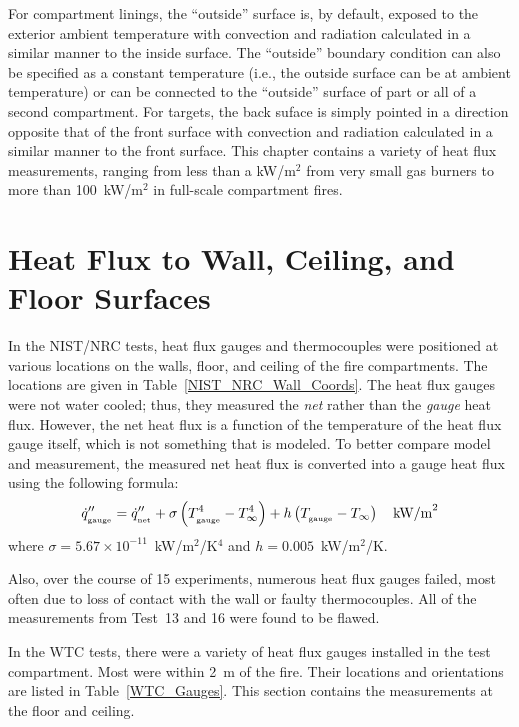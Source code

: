 For compartment linings, the ``outside'' surface is, by default, exposed to the exterior ambient temperature with convection and radiation calculated in a similar manner to the inside surface.  The ``outside'' boundary condition can also be specified as a constant temperature (i.e., the outside surface can be at ambient temperature) or can be connected to the ``outside'' surface of part or all of a second compartment.  For targets, the back suface is simply pointed in a direction opposite that of the front surface with convection and radiation calculated in a similar manner to the front surface. This chapter contains a variety of heat flux measurements, ranging from less than a kW/m$^2$ from very small gas burners  to more than 100~kW/m$^2$ in full-scale compartment fires.

\section{Heat Flux to Wall, Ceiling, and Floor Surfaces}

In the NIST/NRC tests, heat flux gauges and thermocouples were positioned at various locations on the walls, floor, and ceiling of the fire compartments. The locations are given in Table~\ref{NIST_NRC_Wall_Coords}. The heat flux gauges were not water cooled; thus, they measured the {\em net} rather than the {\em gauge} heat flux. However, the net heat flux is a function of the temperature of the heat flux gauge itself, which is not something that is modeled. To better compare model and measurement, the measured net heat flux is converted into a gauge heat flux using the following formula:
\begin{equation}
\dot{q}''_{_{\textnormal{gauge}}} = \dot{q}''_{_{\textnormal{net}}} + \sigma \left( T^4_{_{\textnormal{gauge}}} - T^4_\infty \right) + h  \left( T_{_{\textnormal{gauge}}}-T_\infty \right) \quad \hbox{kW/m}^2
\end{equation}
where $\sigma=5.67 \times 10^{-11}$~kW/m$^2$/K$^4$ and $h=0.005$~kW/m$^2$/K.

Also, over the course of 15 experiments, numerous heat flux gauges failed, most often due to loss of contact with the wall or faulty thermocouples. All of the measurements from Test~13 and 16 were found to be flawed.

In the WTC tests, there were a variety of heat flux gauges installed in the test compartment. Most were within 2~m of the fire. Their locations and orientations are listed in Table~\ref{WTC_Gauges}. This section contains the measurements at the floor and ceiling.

